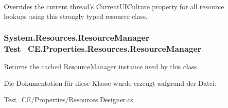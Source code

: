 Overrides the current thread's CurrentUICulture property for all resource lookups using this strongly typed resource class. 

\hypertarget{class_test___c_e_1_1_properties_1_1_resources_a34fefe776becc85e7ae843785ef10db7}{
\subsubsection[{ResourceManager}]{\setlength{\rightskip}{0pt plus 5cm}System.Resources.ResourceManager Test\_\-CE.Properties.Resources.ResourceManager}}
\label{class_test___c_e_1_1_properties_1_1_resources_a34fefe776becc85e7ae843785ef10db7}


Returns the cached ResourceManager instance used by this class. 



Die Dokumentation für diese Klasse wurde erzeugt aufgrund der Datei:\begin{DoxyCompactItemize}
\item 
Test\_\-CE/Properties/Resources.Designer.cs\end{DoxyCompactItemize}
